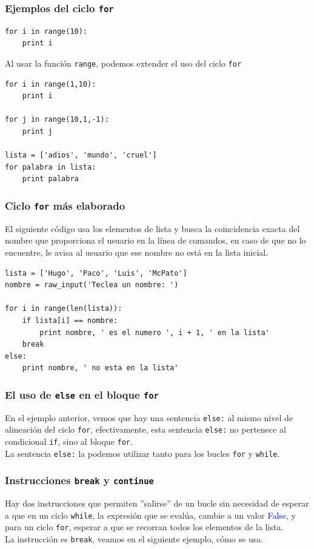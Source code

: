 \begin{frame}[fragile]
\frametitle{Ejemplos del ciclo \texttt{for}}
\begin{lstlisting}
for i in range(10):
    print i
\end{lstlisting}
Al usar la función \texttt{range},  podemos extender el uso del ciclo \texttt{for}
\begin{lstlisting}
for i in range(1,10):
    print i

for j in range(10,1,-1):
    print j

lista = ['adios', 'mundo', 'cruel']
for palabra in lista:
    print palabra
\end{lstlisting}
\end{frame}
\begin{frame}[fragile]
\frametitle{Ciclo \texttt{for} más elaborado}
El siguiente código usa los elementos de lista y busca la coincidencia exacta del nombre que proporciona el usuario en la línea de comandos, en caso de que no lo encuentre, le avisa al usuario que ese nombre no está en la lista inicial.
\begin{lstlisting}
lista = ['Hugo', 'Paco', 'Luis', 'McPato']
nombre = raw_input('Teclea un nombre: ')

for i in range(len(lista)):
    if lista[i] == nombre:
    	print nombre, ' es el numero ', i + 1, ' en la lista'
    break
else:
    print nombre, ' no esta en la lista'
\end{lstlisting}
\end{frame}
\begin{frame}
\frametitle{El uso de \texttt{else} en el bloque \texttt{for}}
En el ejemplo anterior, vemos que hay una sentencia \texttt{else:} al mismo nivel de alineación del ciclo \texttt{for}, efectivamente, esta sentencia \texttt{else:} no pertenece al condicional \texttt{if}, sino al bloque \texttt{for}.
\\
\medskip
La sentencia \texttt{else:} la podemos utilizar tanto para los bucles \texttt{for} y \texttt{while}.
\end{frame}
\begin{frame}
\frametitle{Instrucciones \texttt{break} y \texttt{continue}}
Hay dos instrucciones que permiten ''salirse'' de un bucle sin necesidad de esperar a que en un ciclo \texttt{while}, la expresión que se evalúa, cambie a un valor \textcolor{blue}{False}, y para un ciclo \texttt{for}, esperar a que se recorran todos los elementos de la lista.
\\
\medskip
La instrucción es \texttt{break}, veamos en el siguiente ejemplo, cómo se usa.
\end{frame}

